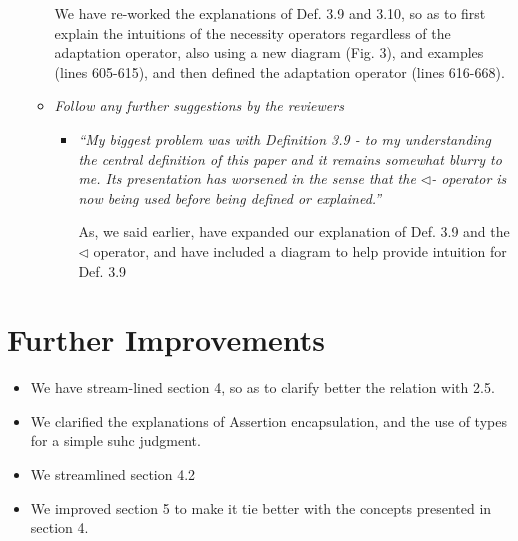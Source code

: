 \documentclass[11pt]{amsart}
\begin{document}
\begin{itemize}
\begin{itemize}
We have re-worked the explanations of Def. 3.9  and 3.10, so as to first explain the intuitions of the necessity operators regardless of the adaptation operator, also using a new  diagram (Fig. 3), and examples (lines  605-615), and then defined the adaptation operator (lines 616-668).

\item
\emph{Follow any further suggestions by the reviewers}
\begin{itemize}
\item
\emph{``My biggest problem was with Definition 3.9 - to my understanding the central definition of this paper and it remains somewhat blurry to me. Its presentation has worsened in the sense that the $\triangleleft$- operator is now being used before being defined or explained.''}
 
As, we said earlier, have expanded our explanation of Def. 3.9 and the $\triangleleft$ operator, and have included a diagram to help provide intuition for Def. 3.9
 
\end{itemize}
\end{itemize}
\end{itemize}

\section{Further Improvements}

\begin{itemize}
\item
We have stream-lined section 4, so as to clarify better the relation with 2.5.
\item
We clarified the explanations of Assertion encapsulation, and the use of types for a simple suhc judgment.

\item
We streamlined section 4.2

\item
We improved section 5 to make it tie better with the concepts presented in section 4.

\end{itemize}


 
\end{document}
